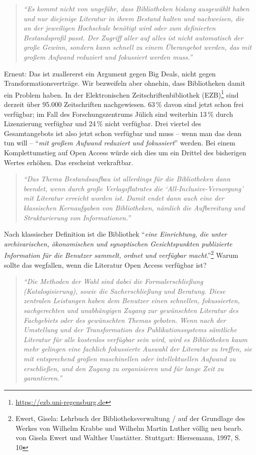 \documentclass[a4paper,
fontsize=11pt,
oneside,
numbers=noperiodatend,
parskip=half-,
bibliography=totoc,
final
]{scrartcl}
\begin{document}
\begin{quote}
\emph{\enquote{Es kommt nicht von ungefähr, dass Bibliotheken bislang
ausgewählt haben und nur diejenige Literatur in ihrem Bestand halten und
nachweisen, die an der jeweiligen Hochschule benötigt wird oder zum
definierten Bestandsprofil passt. Der Zugriff aller auf alles ist nicht
automatisch der große Gewinn, sondern kann schnell zu einem Überangebot
werden, das mit großem Aufwand reduziert und fokussiert werden muss.}}
\end{quote}

Erneut: Das ist zuallererst ein Argument gegen Big Deals, nicht gegen
Transformationsverträge. Wir bezweifeln aber ohnehin, dass Bibliotheken
damit ein Problem haben. In der Elektronischen Zeitschriftenbibliothek
(EZB)\footnote{\url{https://ezb.uni-regensburg.de}} sind derzeit über
95.000 Zeitschriften nachgewiesen. 63\,\% davon sind jetzt schon frei
verfügbar; im Fall des Forschungszentrums Jülich sind weiterhin 13\,\%
durch Lizenzierung verfügbar und 24\,\% nicht verfügbar. Drei viertel
des Gesamtangebots ist also jetzt schon verfügbar und muss -- wenn man
das denn tun will -- \enquote{\emph{mit großem Aufwand reduziert und
fokussiert}} werden. Bei einem Komplettumstieg auf Open Access würde
sich dies um ein Drittel des bisherigen Wertes erhöhen. Das erscheint
verkraftbar.

\begin{quote}
\emph{\enquote{Das Thema Bestandsaufbau ist allerdings für die
Bibliotheken dann beendet, wenn durch große Verlagsflatrates die
\enquote{All-Inclusive-Versorgung} mit Literatur erreicht worden ist.
Damit endet dann auch eine der klassischen Kernaufgaben von
Bibliotheken, nämlich die Aufbereitung und Strukturierung von
Informationen.}}
\end{quote}

Nach klassischer Definition ist die Bibliothek \enquote{\emph{eine
Einrichtung, die unter archivarischen, ökonomischen und synoptischen
Gesichtspunkten publizierte Information für die Benutzer sammelt, ordnet
und verfügbar macht}.}\footnote{Ewert, Gisela: Lehrbuch der
  Bibliotheksverwaltung / auf der Grundlage des Werkes von Wilhelm
  Krabbe und Wilhelm Martin Luther völlig neu bearb. von Gisela Ewert
  und Walther Umstätter. Stuttgart: Hiersemann, 1997, S. 10} Warum
sollte das wegfallen, wenn die Literatur Open Access verfügbar ist?

\begin{quote}
\emph{\enquote{Die Methoden der Wahl sind dabei die Formalerschließung
(Katalogisierung), sowie die Sacherschließung und Beratung. Diese
zentralen Leistungen haben dem Benutzer einen schnellen, fokussierten,
sachgerechten und unabhängigen Zugang zur gewünschten Literatur des
Fachgebiets oder des gewünschten Themas geboten. Wenn nach der
Umstellung und der Transformation des Publikationssystems sämtliche
Literatur für alle kostenlos verfügbar sein wird, wird es Bibliotheken
kaum mehr gelingen eine fachlich fokussierte Auswahl der Literatur zu
treffen, sie mit entsprechend großen maschinellen oder intellektuellen
Aufwand zu erschließen, und den Zugang zu organisieren und für lange
Zeit zu garantieren.}}
\end{quote}
\end{document}
